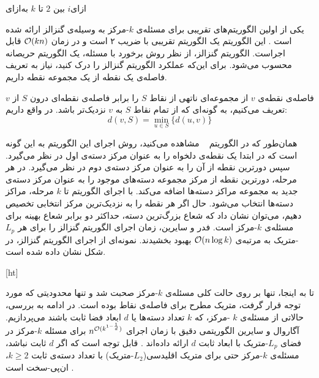 ‌ازای{$i$ بین $2$ تا $k$}
‌به‌ازای

یکی از اولین الگوریتم‌های تقریبی برای مسئله‌ی $k$-مرکز به وسیله‌ی گنزالز ارائه شده است . این الگوریتم یک الگوریتم تقریبی با ضریب ۲ است و در زمان $\mathcal{O}(kn)$ قابل اجراست. الگوریتم گنزالز، از نظر روش برخورد با مسئله، یک الگوریتم حریصانه محسوب می‌شود. برای این‌که عملکرد الگوریتم گنزالز را درک کنید، نیاز به تعریف فاصله‌ی یک نقطه از یک مجموعه نقطه داریم.

فاصله‌ی نقطه‌ی $v$ از‌ مجموعه‌ای‌ ناتهی از نقاط $S$ را برابر فاصله‌ی نقطه‌ای درون $S$ از $v$ تعریف می‌کنیم، به گونه‌ای که از تمام نقاط $S$ به $v$ نزدیک‌تر باشد. در واقع داریم:
$$d(v, S) = \min_{u \in S} \{ d(u, v) \}$$

همان‌طور که در الگوریتم ~ مشاهده می‌کنید، روش اجرای این الگوریتم به این گونه است که در ابتدا یک نقطه‌ی دلخواه را به عنوان مرکز‌ دسته‌ی اول در نظر می‌گیرد. سپس دورترین نقطه‌ از آن را به عنوان مرکز دسته‌ی دوم در نظر می‌گیرد. در هر مرحله، دورترین نقطه از مرکز ‌مجموعه دسته‌های موجود را به عنوان مرکز‌ دسته‌ی جدید به مجموعه مراکز‌ دسته‌ها اضافه می‌کند. با اجرای الگوریتم تا $k$ مرحله، مراکز دسته‌ها انتخاب می‌شود. حال اگر هر نقطه را به نزدیک‌ترین مرکز انتخابی تخصیص دهیم، می‌توان نشان داد که شعاع بزرگ‌ترین دسته، حداکثر دو برابر شعاع بهینه‌ برای مسئله‌ی $k$-مرکز است. فدر و سایرین، زمان اجرای الگوریتم گنزالز را برای هر $L_p$-متریک به مرتبه‌ی $\mathcal{O}(n \log{k})$ بهبود بخشیدند. نمونه‌ای از اجرای الگوریتم گنزالز، در شکل  نشان داده شده است.

[ht]

تا به اینجا، تنها بر روی حالت کلی مسئله‌ی $k$-مرکز صحبت شد و تنها محدودیتی که مورد توجه قرار گرفت، متریک مطرح برای فاصله‌ی نقاط بوده است. در ادامه به بررسی، حالاتی از مسئله‌ی $k$ -مرکز، که $k$ تعداد دسته‌ها یا $d$ ابعاد فضا ثابت باشند می‌پردازیم. آگاروال و سایرین الگوریتمی دقیق با زمان اجرای $n^{\mathcal{O}(k^{1 - \frac{1}{d}})}$ برای مسئله‌ $k$-مرکز در فضای $L_p$-متریک با ابعاد ثابت $d$ ارائه داده‌اند . قابل توجه است که اگر $d$ ثابت نباشد، مسئله‌ی $k$-مرکز حتی برای متریک اقلیدسی($L_2$-متریک) با تعداد دسته‌ی ثابت $k \geq 2$، ان‌پی-سخت است .

